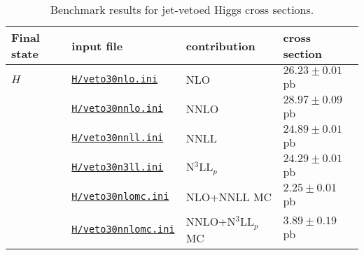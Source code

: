 \renewcommand{\arraystretch}{1.05}
\begin{table}
\begin{tabular}{llll}
\hline
Final state & input file & contribution & cross section \\
\hline
$H$ & \href{\mcfmprocs/Files119/jetveto/veto30nlo.ini}{\texttt{H/veto30nlo.ini}}       & NLO                 &  $26.23 \pm 0.01$ pb   \\
    & \href{\mcfmprocs/Files119/jetveto/veto30nnlo.ini}{\texttt{H/veto30nnlo.ini}}     & NNLO                &  $28.97 \pm 0.09$ pb \\
    & \href{\mcfmprocs/Files119/jetveto/veto30nnll.ini}{\texttt{H/veto30nnll.ini}}     & NNLL                &  $24.89 \pm 0.01$ pb \\
    & \href{\mcfmprocs/Files119/jetveto/veto30n3ll.ini}{\texttt{H/veto30n3ll.ini}}     & N$^3$LL$_p$         &  $24.29 \pm 0.01$ pb \\
    & \href{\mcfmprocs/Files119/jetveto/veto30nlomc.ini}{\texttt{H/veto30nlomc.ini}}   & NLO+NNLL MC         &  $2.25 \pm 0.01$ pb \\
    & \href{\mcfmprocs/Files119/jetveto/veto30nnlomc.ini}{\texttt{H/veto30nnlomc.ini}} & NNLO+N$^3$LL$_p$ MC &  $3.89 \pm 0.19$ pb \\[2pt]
\hline
\end{tabular}
\caption{Benchmark results for jet-vetoed Higgs cross sections.}
\label{table:jetveto_H}
\end{table}
\renewcommand{\arraystretch}{1.0}
